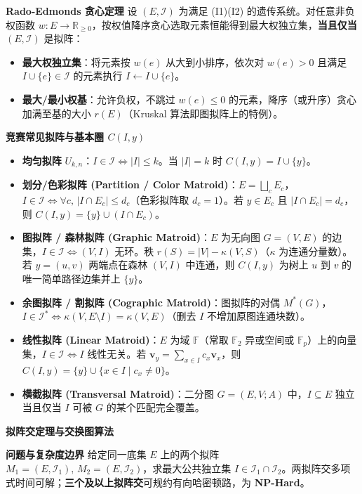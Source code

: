 \textbf{Rado-Edmonds 贪心定理}
设 $(E,\mathcal{I})$ 为满足 (I1)(I2) 的遗传系统。对任意非负权函数 $w:E\to\mathbb{R}_{\ge 0}$，按权值降序贪心选取元素恒能得到最大权独立集，\textbf{当且仅当} $(E,\mathcal{I})$ 是拟阵：
\begin{itemize}
    \item \textbf{最大权独立集}：将元素按 $w(e)$ 从大到小排序，依次对 $w(e)>0$ 且满足 $I\cup\{e\}\in\mathcal{I}$ 的元素执行 $I\gets I\cup\{e\}$。
    \item \textbf{最大/最小权基}：允许负权，不跳过 $w(e)\le 0$ 的元素，降序（或升序）贪心加满至基的大小 $r(E)$（Kruskal 算法即图拟阵上的特例）。
\end{itemize}

\textbf{竞赛常见拟阵与基本圈 $C(I,y)$}
\begin{itemize}
    \item \textbf{均匀拟阵} $U_{k,n}$：$I\in\mathcal{I}\iff |I|\le k$。当 $|I|=k$ 时 $C(I,y)=I\cup\{y\}$。
    \item \textbf{划分/色彩拟阵 (Partition / Color Matroid)}：$E=\bigsqcup_{c} E_c$，$I\in\mathcal{I}\iff \forall c,\,|I\cap E_c|\le d_c$（色彩拟阵取 $d_c=1$）。若 $y\in E_c$ 且 $|I\cap E_c|=d_c$，则 $C(I,y)=\{y\}\cup(I\cap E_c)$。
    \item \textbf{图拟阵 / 森林拟阵 (Graphic Matroid)}：$E$ 为无向图 $G=(V,E)$ 的边集，$I\in\mathcal{I}\iff (V,I)$ 无环。秩 $r(S)=|V|-\kappa(V,S)$（$\kappa$ 为连通分量数）。若 $y=(u,v)$ 两端点在森林 $(V,I)$ 中连通，则 $C(I,y)$ 为树上 $u$ 到 $v$ 的唯一简单路径边集并上 $\{y\}$。
    \item \textbf{余图拟阵 / 割拟阵 (Cographic Matroid)}：图拟阵的对偶 $M^*(G)$，$I\in\mathcal{I}^*\iff \kappa(V,E\setminus I)=\kappa(V,E)$（删去 $I$ 不增加原图连通块数）。
    \item \textbf{线性拟阵 (Linear Matroid)}：$E$ 为域 $\mathbb{F}$（常取 $\mathbb{F}_2$ 异或空间或 $\mathbb{F}_p$）上的向量集，$I\in\mathcal{I}\iff I$ 线性无关。若 $\mathbf{v}_y=\sum_{x\in I} c_x \mathbf{v}_x$，则 $C(I,y)=\{y\}\cup\{x\in I\mid c_x\neq 0\}$。
    \item \textbf{横截拟阵 (Transversal Matroid)}：二分图 $G=(E,V;A)$ 中，$I\subseteq E$ 独立当且仅当 $I$ 可被 $G$ 的某个匹配完全覆盖。
\end{itemize}

\textbf{拟阵交定理与交换图算法}

\textbf{问题与复杂度边界}
给定同一底集 $E$ 上的两个拟阵 $M_1=(E,\mathcal{I}_1),\,M_2=(E,\mathcal{I}_2)$，求最大公共独立集 $I\in\mathcal{I}_1\cap\mathcal{I}_2$。两拟阵交多项式时间可解；\textbf{三个及以上拟阵交}可规约有向哈密顿路，为 \textbf{NP-Hard}。

